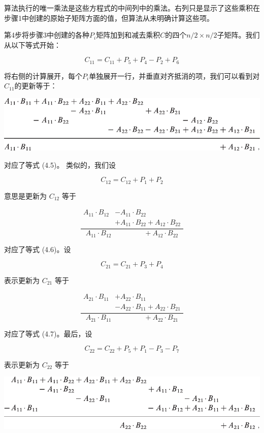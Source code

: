 \documentclass[lang=cn,newtx,10pt,scheme=chinese]{elegantbook}
\begin{document}
算法执行的唯一乘法是这些方程式的中间列中的乘法。右列只是显示了这些乘积在步骤1中创建的原始子矩阵方面的值，但算法从未明确计算这些项。

第4步将步骤3中创建的各种$P_i$矩阵加到和减去乘积$C$的四个$n/2\times n/2$子矩阵。我们从以下等式开始：

$$
C_{11}=C_{11}+P_5+P_4-P_2+P_6
$$

将右侧的计算展开，每个$P_i$单独展开一行，并垂直对齐抵消的项，我们可以看到对$C_{11}$的更新等于：

\includegraphics{算法导论第四版插图/第四章/斯特拉森算法公式.pdf}

对应了等式 (4.5)。 类似的，我们设

$$
C_{12}=C_{12}+P_1+P_2
$$

意思是更新为 $C_{12}$ 等于

$$
\frac{
    \begin{aligned}
        A_{11} \cdot B_{12} & -A_{11} \cdot B_{22} \\
        & +A_{11} \cdot B_{22}+A_{12} \cdot B_{22}
        \end{aligned}
}{A_{11} \cdot B_{12} \quad\quad\quad\;\;\quad+A_{12} \cdot B_{22}}
$$

对应了等式 (4.6)。设

$$
C_{21}=C_{21}+P_3+P_4
$$

表示更新为 $C_{21}$ 等于

$$
\frac{
    \begin{aligned}
        A_{21} \cdot B_{11} & +A_{22} \cdot B_{11} \\
        & -A_{22} \cdot B_{11}+A_{22} \cdot B_{21}
        \end{aligned}
}{
    A_{21} \cdot B_{11} \quad\quad\quad\;\;\quad+A_{22} \cdot B_{21}
}
$$

对应了等式 (4.7)。最后，设

$$
C_{22}=C_{22}+P_5+P_1-P_3-P_7
$$

表示更新为 $C_{22}$ 等于

\includegraphics{算法导论第四版插图/第四章/斯特拉森公式2.pdf}
\end{document}

